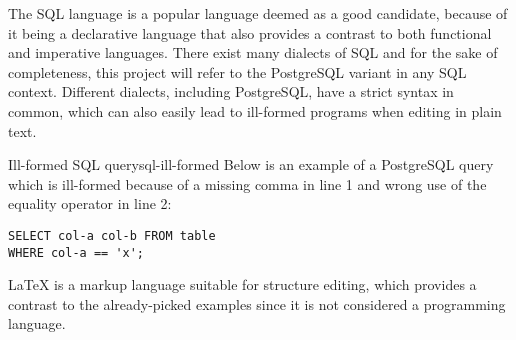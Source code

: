 The SQL language is a popular language deemed as a good candidate, because of it being a declarative language that also provides a contrast to both functional and imperative languages. There exist many dialects of SQL and for the sake of completeness, this project will refer to the PostgreSQL\cite{postgresql-about} variant in any SQL context. Different dialects, including PostgreSQL, have a strict syntax in common, which can also easily lead to ill-formed programs when editing in plain text.
\begin{example}{Ill-formed SQL query}{sql-ill-formed}
    Below is an example of a PostgreSQL query which is ill-formed because of a missing comma in line 1 and wrong use of the equality operator in line 2:
    \begin{lstlisting}
SELECT col-a col-b FROM table
WHERE col-a == 'x';
\end{lstlisting}
\end{example}

\LaTeX\cite{latex-about} is a markup language suitable for structure editing, which provides a contrast to the already-picked examples since it is not considered a programming language.